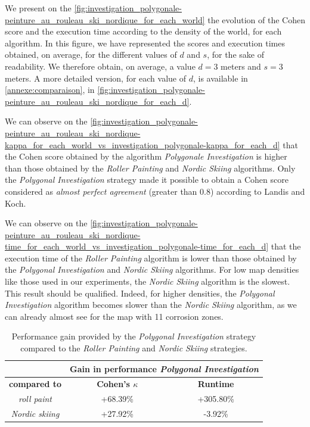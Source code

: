 We present on the \ref{fig:investigation_polygonale-peinture_au_rouleau_ski_nordique_for_each_world} the evolution of the Cohen score and the execution time according to the density of the world, for each algorithm.
In this figure, we have represented the scores and execution times obtained, on average, for the different values of $d$ and $s$, for the sake of readability.
We therefore obtain, on average, a value $d = 3$ meters and $s = 3$ meters.
A more detailed version, for each value of $d$, is available in \ref{annexe:comparaison}, in \ref{fig:investigation_polygonale-peinture_au_rouleau_ski_nordique_for_each_d}.

We can observe on the \ref{fig:investigation_polygonale-peinture_au_rouleau_ski_nordique-kappa_for_each_world_vs_investigation_polygonale-kappa_for_each_d} that the Cohen score obtained by the algorithm \textit{Polygonale Investigation} is higher than those obtained by the \textit{Roller Painting} and \textit{Nordic Skiing} algorithms.
Only the \textit{Polygonal Investigation} strategy made it possible to obtain a Cohen score considered as \textit{almost perfect agreement} (greater than 0.8) according to Landis and Koch.

We can observe on the \ref{fig:investigation_polygonale-peinture_au_rouleau_ski_nordique-time_for_each_world_vs_investigation_polygonale-time_for_each_d} that the execution time of the \textit{Roller Painting} algorithm is lower than those obtained by the \textit{Polygonal Investigation} and \textit{Nordic Skiing} algorithms.
For low map densities like those used in our experiments, the \textit{Nordic Skiing} algorithm is the slowest.
This result should be qualified.
Indeed, for higher densities, the \textit{Polygonal Investigation} algorithm becomes slower than the \textit{Nordic Skiing} algorithm, as we can already almost see for the map with 11 corrosion zones.

\begin{table}[h!]
	\centering
	\begin{tabular}{|c|c|c|}
		\hline
		& \multicolumn{2}{c|}{\textbf{Gain in performance \textit{Polygonal Investigation}}} \\
		\hline
		\textbf{compared to} & \textbf{Cohen's $\kappa$} & \textbf{Runtime} \\
		\hline
		\textit{roll paint} & +68.39\% & +305.80\% \\
		\hline
		\textit{Nordic skiing} & +27.92\% & -3.92\% \\
		\hline
	\end{tabular}
	\caption{Performance gain provided by the \textit{Polygonal Investigation} strategy compared to the \textit{Roller Painting} and \textit{Nordic Skiing} strategies.}
	\label{tab:gain}
\end{table}

